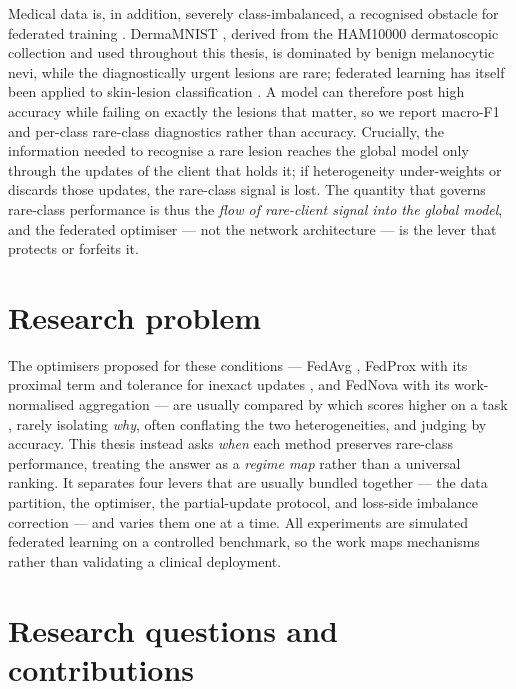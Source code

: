 \documentclass[11pt,a4paper]{report}
\begin{document}
Medical data is, in addition, severely class-imbalanced, a recognised obstacle
for federated training \citep{wang2021classimbalance}. DermaMNIST
\citep{yang2023medmnistv2}, derived from the HAM10000 dermatoscopic collection
\citep{tschandl2018ham10000} and used throughout this thesis, is dominated by
benign melanocytic nevi, while the diagnostically urgent lesions are rare;
federated learning has itself been applied to skin-lesion classification
\citep{yaqoob2023skinfl}. A model
can therefore post high accuracy while failing on exactly the lesions that matter,
so we report macro-F1 and per-class rare-class diagnostics rather than accuracy.
Crucially, the information needed to recognise a rare lesion reaches the global
model only through the updates of the client that holds it; if heterogeneity
under-weights or discards those updates, the rare-class signal is lost. The
quantity that governs rare-class performance is thus the \emph{flow of
rare-client signal into the global model}, and the federated optimiser --- not the
network architecture --- is the lever that protects or forfeits it.

\section{Research problem}
\label{sec:intro-problem}

The optimisers proposed for these conditions --- FedAvg \citep{mcmahan2017fedavg},
FedProx with its proximal term and tolerance for inexact updates
\citep{li2020fedprox}, and FedNova with its work-normalised aggregation
\citep{wang2020fednova} --- are usually compared by which scores higher on a task
\citep{li2022niidbench}, rarely isolating \emph{why}, often conflating the two
heterogeneities, and judging by accuracy. This thesis instead asks \emph{when}
each method preserves rare-class performance, treating the answer as a
\emph{regime map} rather than a universal ranking. It separates four levers that
are usually bundled together --- the data partition, the optimiser, the
partial-update protocol, and loss-side imbalance correction --- and varies them one
at a time. All experiments are simulated federated learning on a controlled
benchmark, so the work maps mechanisms rather than validating a clinical
deployment.

\section{Research questions and contributions}
\label{sec:intro-questions}
\end{document}

